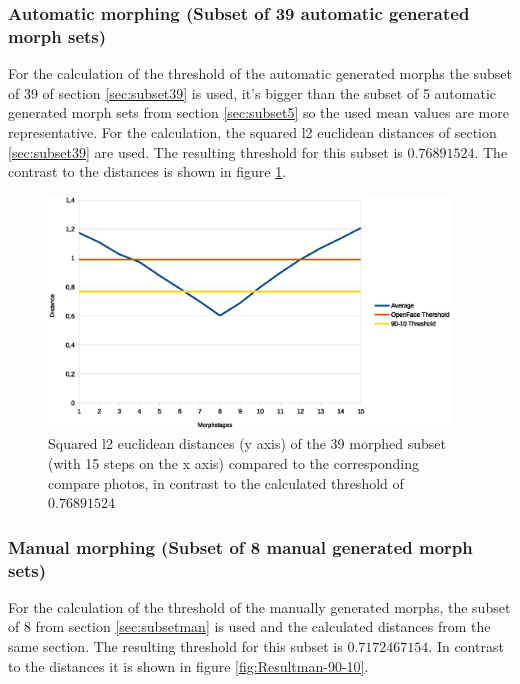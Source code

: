 \subsubsection{Automatic morphing (Subset of 39 automatic generated morph sets)}\label{sec:automorph-thres}
For the calculation of the threshold of the automatic generated morphs the subset of 39 of section \ref{sec:subset39} is used, it's bigger than the subset of 5 automatic generated morph sets from section \ref{sec:subset5} so the used mean values are more representative.
For the calculation, the squared l2 euclidean distances of section \ref{sec:subset39} are used.
The resulting threshold for this subset is \textbf{$0.76891524$}. The contrast to the distances is shown in figure \ref{fig:Result39-90-10}.


\begin{figure}[htbp] 
	\centering
		\includegraphics[width=0.95\textwidth]{Resources/result39-90-10ODF.eps}
	\caption{Squared l2 euclidean distances (y axis) of the 39 morphed subset (with 15 steps on the x axis) compared to the corresponding compare photos, in contrast to the calculated threshold of $0.76891524$} %
	\label{fig:Result39-90-10}
\end{figure}

\subsubsection{Manual morphing (Subset of 8 manual generated morph sets)}\label{sec:manmorph-thres}
For the calculation of the threshold of the manually generated morphs, the subset of 8 from section \ref{sec:subsetman} is used and the calculated distances from the same section.
The resulting threshold for this subset is \textbf{$0.7172467154$}. In contrast to the distances it is shown in figure \ref{fig:Resultman-90-10}.


